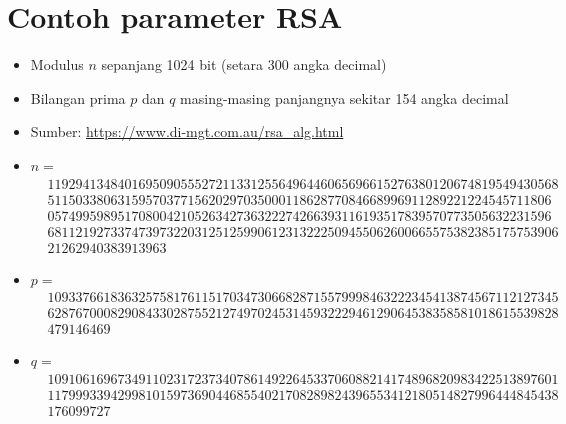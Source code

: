 \documentclass{article}
\begin{document}

\section*{Contoh parameter RSA}

\begin{itemize}
    \item Modulus $n$ sepanjang 1024 bit (setara 300 angka decimal)
    \item Bilangan prima $p$ dan $q$ masing-masing panjangnya sekitar 154 angka decimal
    \item Sumber: \url{https://www.di-mgt.com.au/rsa_alg.html}
\end{itemize}

\begin{itemize}
    \item $n = $\
    \begin{align*}
    &1192941348401695090555272113312556496446065696615276380120674819549430568 \\
    &511503380631595703771562029703500011862877084668996911289221224545711806 \\
    &057499598951708004210526342736322274266393116193517839570773505632231596 \\
    &6811219273374739732203125125990612313222509455062600665575382385175753906 \\
    &21262940383913963
    \end{align*}

    \item $p = $\
    \begin{align*}
    &1093376618363257581761151703473066828715579998463222345413874567112127345 \\
    &6287670008290843302875521274970245314593222946129064538358581018615539828 \\
    &479146469
    \end{align*}

    \item $q = $\
    \begin{align*}
    &1091061696734911023172373407861492264533706088214174896820983422513897601 \\
    &1179993394299810159736904468554021708289824396553412180514827996444845438 \\
    &176099727
    \end{align*}
\end{itemize}
\end{document}
